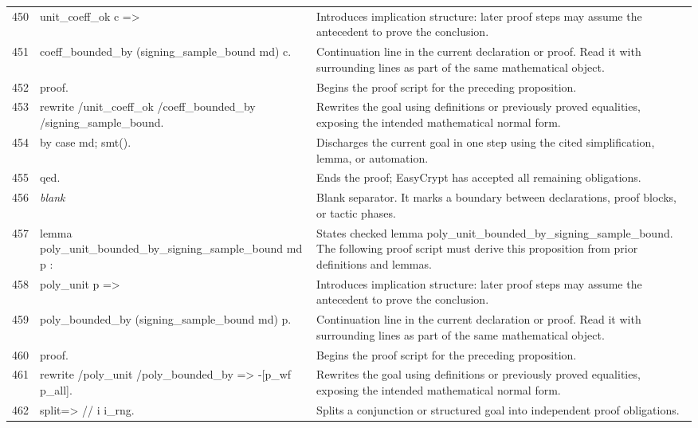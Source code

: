 \documentclass[10pt]{article}
\begin{document}
\begin{longtable}{r L{0.53\textwidth} L{0.37\textwidth}}
450 & {\ttfamily\scriptsize   unit\_coeff\_ok c =>} & Introduces implication structure: later proof steps may assume the antecedent to prove the conclusion. \\
451 & {\ttfamily\scriptsize   coeff\_bounded\_by (signing\_sample\_bound md) c.} & Continuation line in the current declaration or proof.  Read it with surrounding lines as part of the same mathematical object. \\
452 & {\ttfamily\scriptsize proof.} & Begins the proof script for the preceding proposition. \\
453 & {\ttfamily\scriptsize rewrite /unit\_coeff\_ok /coeff\_bounded\_by /signing\_sample\_bound.} & Rewrites the goal using definitions or previously proved equalities, exposing the intended mathematical normal form. \\
454 & {\ttfamily\scriptsize by case md; smt().} & Discharges the current goal in one step using the cited simplification, lemma, or automation. \\
455 & {\ttfamily\scriptsize qed.} & Ends the proof; EasyCrypt has accepted all remaining obligations. \\
456 & {\ttfamily\scriptsize \emph{blank}} & Blank separator.  It marks a boundary between declarations, proof blocks, or tactic phases. \\
457 & {\ttfamily\scriptsize lemma poly\_unit\_bounded\_by\_signing\_sample\_bound md p :} & States checked lemma poly\_unit\_bounded\_by\_signing\_sample\_bound.  The following proof script must derive this proposition from prior definitions and lemmas. \\
458 & {\ttfamily\scriptsize   poly\_unit p =>} & Introduces implication structure: later proof steps may assume the antecedent to prove the conclusion. \\
459 & {\ttfamily\scriptsize   poly\_bounded\_by (signing\_sample\_bound md) p.} & Continuation line in the current declaration or proof.  Read it with surrounding lines as part of the same mathematical object. \\
460 & {\ttfamily\scriptsize proof.} & Begins the proof script for the preceding proposition. \\
461 & {\ttfamily\scriptsize rewrite /poly\_unit /poly\_bounded\_by => -[p\_wf p\_all].} & Rewrites the goal using definitions or previously proved equalities, exposing the intended mathematical normal form. \\
462 & {\ttfamily\scriptsize split=> // i i\_rng.} & Splits a conjunction or structured goal into independent proof obligations. \\

\end{longtable}
\end{document}
